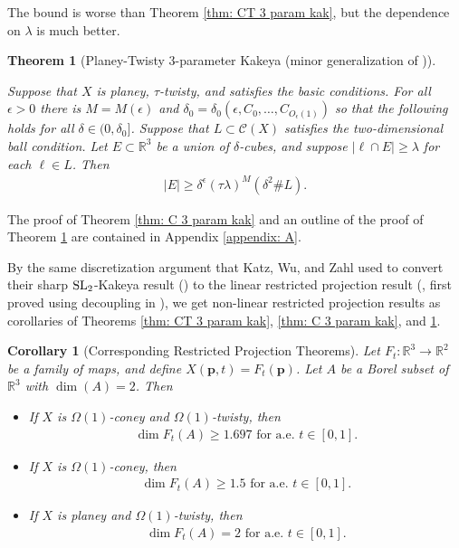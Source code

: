 \documentclass[12pt]{amsart}
\numberwithin{equation}{section}
\newtheorem{theorem}{Theorem}
\newtheorem{corollary}[lemma]{Corollary}
\newcommand{\R}{\mathbb{R}}
\newcommand{\1}{\mathbbm{1}}
\newcommand{\p}{\mathbf p}
\begin{document}
The bound is worse than Theorem \ref{thm: CT 3 param kak}, but the dependence on $\lambda$ is much better.


\begin{theorem}[Planey-Twisty 3-parameter Kakeya (minor generalization of )]\label{thm: PT 3 param kak}

    Suppose that $X$ is planey, $\tau$-twisty, and satisfies the basic conditions. For all $\epsilon > 0$ there is $M = M(\epsilon)$ and $\delta_0 = \delta_0(\epsilon, C_0,\ldots, C_{O_\epsilon(1)})$ so that the following holds for all $\delta \in (0,\delta_0]$. Suppose that $L \subset \mathcal C(X)$ satisfies the two-dimensional ball condition.
    Let $E \subset \R^3$ be a union of $\delta$-cubes, and suppose $|\ell \cap E| \geq \lambda$ for each $\ell \in L$. Then 
    \begin{align}
        |E| \geq \delta^\epsilon (\tau \lambda)^M  (\delta^2 \# L).
    \end{align}
\end{theorem}
The proof of Theorem \ref{thm: C 3 param kak} and an outline of the proof of Theorem \ref{thm: PT 3 param kak} are contained in Appendix \ref{appendix: A}.


By the same discretization argument that Katz, Wu, and Zahl used to convert their sharp $\rm{SL}_2$-Kakeya result (\cite[Theorem 1.2]{KWZ}) to the linear restricted projection result (\cite[Theorem 1.3]{KWZ}, first proved using decoupling in \cite{ganRestrictedProjectionsPlanes}), we get non-linear restricted projection results as corollaries of Theorems \ref{thm: CT 3 param kak}, \ref{thm: C 3 param kak}, and \ref{thm: PT 3 param kak}. 

\begin{corollary}[Corresponding Restricted Projection Theorems]
    Let $F_t : \R^3 \to \R^2$ be a family of maps, and define $X(\p,t) = F_t(\p)$. Let $A$ be a Borel subset of $\R^3$ with $\dim(A) = 2$. Then 
    \begin{itemize}
        \item If $X$ is $\Omega(1)$-coney and $\Omega(1)$-twisty, then 
        \begin{align}
            \dim F_t(A) \geq 1.697  \text{ for a.e. $t \in [0,1]$}.
        \end{align}
        \item If $X$ is $\Omega(1)$-coney,
        then 
        \begin{align}
            \dim F_t(A) \geq 1.5 \text{ for a.e. $t \in [0,1]$}.
        \end{align}
        \item If $X$ is planey and $\Omega(1)$-twisty, then 
        \begin{align}
            \dim F_t(A) = 2  \text{ for a.e. $t \in [0,1]$}.
        \end{align}
    \end{itemize}
\end{corollary}
\end{document}
